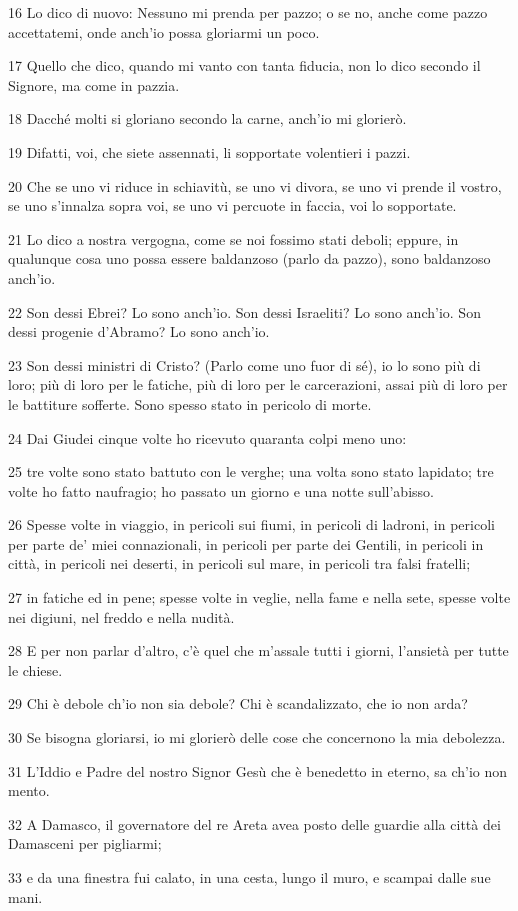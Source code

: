 \par 16 Lo dico di nuovo: Nessuno mi prenda per pazzo; o se no, anche come pazzo accettatemi, onde anch'io possa gloriarmi un poco.
\par 17 Quello che dico, quando mi vanto con tanta fiducia, non lo dico secondo il Signore, ma come in pazzia.
\par 18 Dacché molti si gloriano secondo la carne, anch'io mi glorierò.
\par 19 Difatti, voi, che siete assennati, li sopportate volentieri i pazzi.
\par 20 Che se uno vi riduce in schiavitù, se uno vi divora, se uno vi prende il vostro, se uno s'innalza sopra voi, se uno vi percuote in faccia, voi lo sopportate.
\par 21 Lo dico a nostra vergogna, come se noi fossimo stati deboli; eppure, in qualunque cosa uno possa essere baldanzoso (parlo da pazzo), sono baldanzoso anch'io.
\par 22 Son dessi Ebrei? Lo sono anch'io. Son dessi Israeliti? Lo sono anch'io. Son dessi progenie d'Abramo? Lo sono anch'io.
\par 23 Son dessi ministri di Cristo? (Parlo come uno fuor di sé), io lo sono più di loro; più di loro per le fatiche, più di loro per le carcerazioni, assai più di loro per le battiture sofferte. Sono spesso stato in pericolo di morte.
\par 24 Dai Giudei cinque volte ho ricevuto quaranta colpi meno uno:
\par 25 tre volte sono stato battuto con le verghe; una volta sono stato lapidato; tre volte ho fatto naufragio; ho passato un giorno e una notte sull'abisso.
\par 26 Spesse volte in viaggio, in pericoli sui fiumi, in pericoli di ladroni, in pericoli per parte de' miei connazionali, in pericoli per parte dei Gentili, in pericoli in città, in pericoli nei deserti, in pericoli sul mare, in pericoli tra falsi fratelli;
\par 27 in fatiche ed in pene; spesse volte in veglie, nella fame e nella sete, spesse volte nei digiuni, nel freddo e nella nudità.
\par 28 E per non parlar d'altro, c'è quel che m'assale tutti i giorni, l'ansietà per tutte le chiese.
\par 29 Chi è debole ch'io non sia debole? Chi è scandalizzato, che io non arda?
\par 30 Se bisogna gloriarsi, io mi glorierò delle cose che concernono la mia debolezza.
\par 31 L'Iddio e Padre del nostro Signor Gesù che è benedetto in eterno, sa ch'io non mento.
\par 32 A Damasco, il governatore del re Areta avea posto delle guardie alla città dei Damasceni per pigliarmi;
\par 33 e da una finestra fui calato, in una cesta, lungo il muro, e scampai dalle sue mani.

